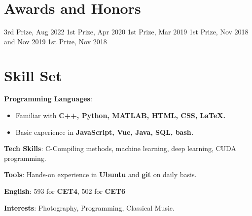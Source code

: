 \documentclass{chicv}
\begin{document}
\section{Awards and Honors}
 {3rd Prize, Aug 2022}
 {1st Prize, Apr 2020}
 {1st Prize, Mar 2019}
 {1st Prize, Nov 2018 and Nov 2019}
 {1st Prize, Nov 2018}

\section{Skill Set}
\begin{compactlist}
  \item \textbf{Programming Languages}: 
  \begin{itemize}
    \item Familiar with \textbf{C++, Python, MATLAB, HTML, CSS, \LaTeX.}
    \item Basic experience in \textbf{JavaScript, Vue, Java, SQL, bash.}
  \end{itemize}
  \item \textbf{Tech Skills}: C-Compiling methods, machine learning, deep learning, CUDA programming.
  \item \textbf{Tools}: Hands-on experience in \textbf{Ubuntu} and \textbf{git} on daily basis.
  \item \textbf{English}: 593 for \textbf{CET4}, 502 for \textbf{CET6}
  \item \textbf{Interests}: Photography, Programming, Classical Music.
\end{compactlist}
\end{document}
